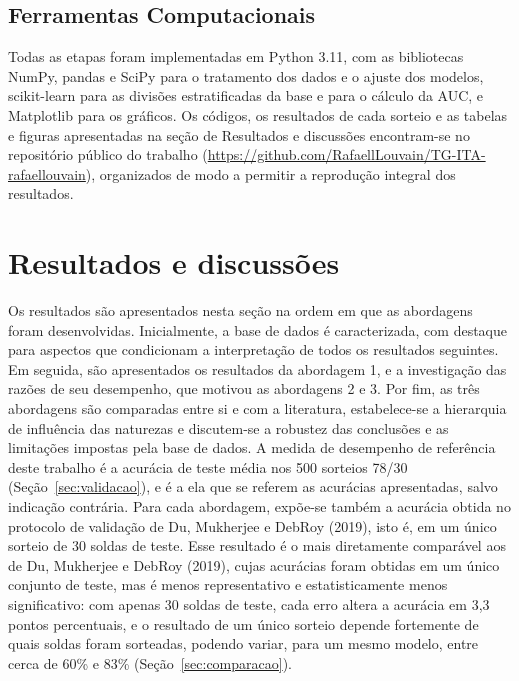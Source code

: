 \documentclass[12pt,openany]{report}
\begin{document}
\section{Ferramentas Computacionais}
\label{sec:ferramentas}

Todas as etapas foram implementadas em Python 3.11, com as bibliotecas NumPy, pandas e SciPy para o tratamento dos dados e o ajuste dos modelos, scikit-learn para as divisões estratificadas da base e para o cálculo da AUC, e Matplotlib para os gráficos. Os códigos, os resultados de cada sorteio e as tabelas e figuras apresentadas na seção de Resultados e discussões encontram-se no repositório público do trabalho (\url{https://github.com/RafaellLouvain/TG-ITA-rafaellouvain}), organizados de modo a permitir a reprodução integral dos resultados.


\chapter{Resultados e discussões}
\label{cap:resultados}

Os resultados são apresentados nesta seção na ordem em que as abordagens foram desenvolvidas. Inicialmente, a base de dados é caracterizada, com destaque para aspectos que condicionam a interpretação de todos os resultados seguintes. Em seguida, são apresentados os resultados da abordagem 1, e a investigação das razões de seu desempenho, que motivou as abordagens 2 e 3. Por fim, as três abordagens são comparadas entre si e com a literatura, estabelece-se a hierarquia de influência das naturezas e discutem-se a robustez das conclusões e as limitações impostas pela base de dados. A medida de desempenho de referência deste trabalho é a acurácia de teste média nos 500 sorteios 78/30 (Seção~\ref{sec:validacao}), e é a ela que se referem as acurácias apresentadas, salvo indicação contrária. Para cada abordagem, expõe-se também a acurácia obtida no protocolo de validação de Du, Mukherjee e DebRoy (2019), isto é, em um único sorteio de 30 soldas de teste. Esse resultado é o mais diretamente comparável aos de Du, Mukherjee e DebRoy (2019), cujas acurácias foram obtidas em um único conjunto de teste, mas é menos representativo e estatisticamente menos significativo: com apenas 30 soldas de teste, cada erro altera a acurácia em 3,3 pontos percentuais, e o resultado de um único sorteio depende fortemente de quais soldas foram sorteadas, podendo variar, para um mesmo modelo, entre cerca de 60\% e 83\% (Seção~\ref{sec:comparacao}).
\end{document}
